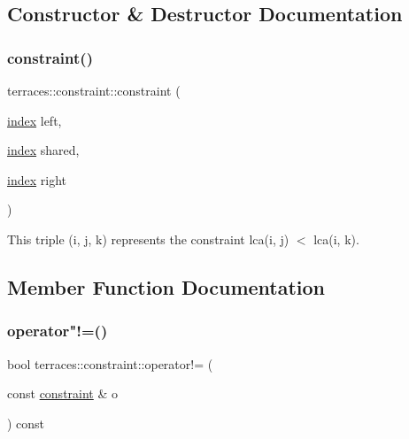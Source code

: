 \subsection{Constructor \& Destructor Documentation}
\mbox{\label{structterraces_1_1constraint_a6720264dc0ff93da5d69f3465239b070}} 
\subsubsection{\texorpdfstring{constraint()}{constraint()}}
{\footnotesize\ttfamily terraces\+::constraint\+::constraint (\begin{DoxyParamCaption}\item[{\hyperlink{namespaceterraces_adbc33ccb543d1634e96d0eb02e472c77}{index}}]{left,  }\item[{\hyperlink{namespaceterraces_adbc33ccb543d1634e96d0eb02e472c77}{index}}]{shared,  }\item[{\hyperlink{namespaceterraces_adbc33ccb543d1634e96d0eb02e472c77}{index}}]{right }\end{DoxyParamCaption})\hspace{0.3cm}{\ttfamily [inline]}}



This triple (i, j, k) represents the constraint lca(i, j) $<$ lca(i, k). 



\subsection{Member Function Documentation}
\mbox{\label{structterraces_1_1constraint_afa53046f3ebfbc0855747647baec02c9}} 
\subsubsection{\texorpdfstring{operator"!=()}{operator!=()}}
{\footnotesize\ttfamily bool terraces\+::constraint\+::operator!= (\begin{DoxyParamCaption}\item[{const \hyperlink{structterraces_1_1constraint}{constraint} \&}]{o }\end{DoxyParamCaption}) const\hspace{0.3cm}{\ttfamily [inline]}}

